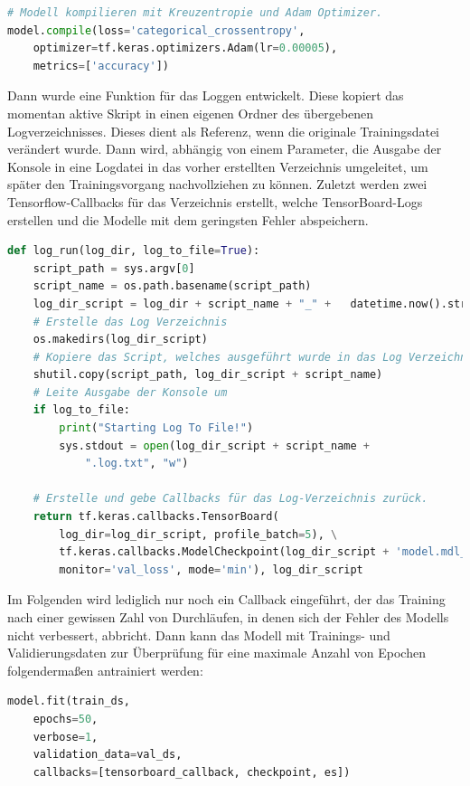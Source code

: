 \documentclass[11pt,bibliography=totocnumbered]{scrartcl}
\begin{document}
\begin{lstlisting}[language=python,firstnumber=1,caption={Kompilierung eines Modells},label=lst:compile_model]
# Modell kompilieren mit Kreuzentropie und Adam Optimizer.
model.compile(loss='categorical_crossentropy',
	optimizer=tf.keras.optimizers.Adam(lr=0.00005),
	metrics=['accuracy'])
\end{lstlisting}
Dann wurde eine Funktion für das Loggen entwickelt. Diese kopiert das momentan aktive Skript in einen eigenen Ordner des übergebenen Logverzeichnisses. Dieses dient als Referenz, wenn die originale Trainingsdatei verändert wurde. Dann wird, abhängig von einem Parameter, die Ausgabe der Konsole in eine Logdatei in das vorher erstellten Verzeichnis umgeleitet, um später den Trainingsvorgang nachvollziehen zu können. Zuletzt werden zwei Tensorflow-Callbacks für das Verzeichnis erstellt, welche TensorBoard-Logs erstellen und die Modelle mit dem geringsten Fehler abspeichern.
\begin{lstlisting}[language=python,firstnumber=1,caption={Logging Funktion für Trainingsvorgänge},label=lst:log_train]
def log_run(log_dir, log_to_file=True):
	script_path = sys.argv[0]
	script_name = os.path.basename(script_path)
	log_dir_script = log_dir + script_name + "_" + 	 datetime.now().strftime("%d-%m-%Y_%H%M%S") + "/"
	# Erstelle das Log Verzeichnis
	os.makedirs(log_dir_script)
	# Kopiere das Script, welches ausgeführt wurde in das Log Verzeichnis
	shutil.copy(script_path, log_dir_script + script_name)
	# Leite Ausgabe der Konsole um
	if log_to_file:
		print("Starting Log To File!")
		sys.stdout = open(log_dir_script + script_name + 
			".log.txt", "w")
	
	# Erstelle und gebe Callbacks für das Log-Verzeichnis zurück.
	return tf.keras.callbacks.TensorBoard(
		log_dir=log_dir_script, profile_batch=5), \
		tf.keras.callbacks.ModelCheckpoint(log_dir_script + 'model.mdl_wts.hdf5', save_best_only=True,
		monitor='val_loss', mode='min'), log_dir_script
\end{lstlisting}
Im Folgenden wird lediglich nur noch ein Callback eingeführt, der das Training nach einer gewissen Zahl von Durchläufen, in denen sich der Fehler des Modells nicht verbessert, abbricht. Dann kann das Modell mit Trainings- und Validierungsdaten zur Überprüfung für eine maximale Anzahl von Epochen folgendermaßen antrainiert werden:
\begin{lstlisting}[language=python,firstnumber=1,caption={Start des Trainings mit Keras},label=lst:train_start]
model.fit(train_ds,
	epochs=50,
	verbose=1,
	validation_data=val_ds,
	callbacks=[tensorboard_callback, checkpoint, es])
\end{lstlisting}
\end{document}
